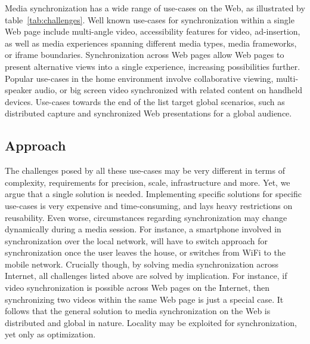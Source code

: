 Media synchronization has a wide range of use-cases on the Web, as illustrated
by table~\ref{tab:challenges}. Well known use-cases for synchronization within a
single Web page include multi-angle video, accessibility features for video,
ad-insertion, as well as media experiences spanning different media types,
media frameworks, or iframe boundaries. Synchronization across Web pages allow
Web pages to present alternative views into a single experience, increasing
possibilities further. Popular use-cases in the home environment involve
collaborative viewing, multi-speaker audio, or big screen video synchronized
with related content on handheld devices. Use-cases towards the end of the
list target global scenarios, such as distributed capture and synchronized Web
presentations for a global audience.

\subsection{Approach}

The challenges posed by all these use-cases may be very different in terms of
complexity, requirements for precision, scale, infrastructure and more. Yet,
we argue that a single solution is needed. Implementing specific solutions for
specific use-cases is very expensive and time-consuming, and lays heavy
restrictions on reusability. Even worse, circumstances regarding
synchronization may change dynamically during a media session. For instance, a
smartphone involved in synchronization over the local network, will have to
switch approach for synchronization once the user leaves the house, or
switches from WiFi to the mobile network. Crucially though, by solving media
synchronization across Internet, all challenges listed above are solved by
implication. For instance, if video synchronization is possible across Web
pages on the Internet, then synchronizing two videos within the same Web page
is just a special case. It follows that the general solution to media
synchronization on the Web is distributed and global in nature. Locality may
be exploited for synchronization, yet only as optimization.
